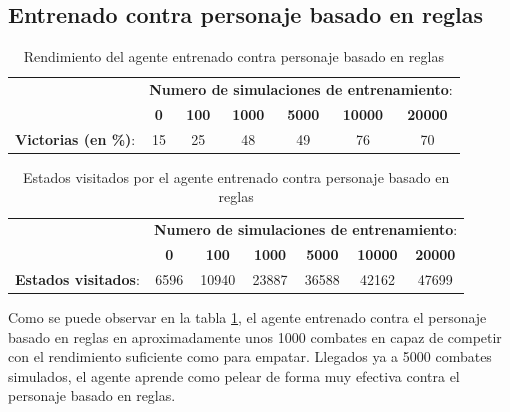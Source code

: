 \subsection{Entrenado contra personaje basado en reglas}
\label{agente1}
\begin{table}
	\begin{center}
		\begin{tabular}{c|c|c|c|c|c|c|}
			& \multicolumn{6}{c|}{\textbf{Numero de simulaciones de entrenamiento}:}\\
			\cline{2-7} & \textbf{0} & \textbf{100} & \textbf{1000} & \textbf{5000} & \textbf{10000} & \textbf{20000}\\
			
			\hline
			\textbf{Victorias (en \%)}: &  15 & 25 & 48 & 49 & 76 & 70\\
			
			\hline
		\end{tabular}
		\caption{Rendimiento del agente entrenado contra personaje basado en reglas}
		\label{rend:reglas:victorias}
	\end{center}
\end{table}

\begin{table}
	\begin{center}
		\begin{tabular}{c|c|c|c|c|c|c|}
			& \multicolumn{6}{c|}{\textbf{Numero de simulaciones de entrenamiento}:}\\
			\cline{2-7} & \textbf{0} & \textbf{100} & \textbf{1000} & \textbf{5000} & \textbf{10000} & \textbf{20000}\\
			
			\hline
			\textbf{Estados visitados}: &  6596 & 10940 & 23887 & 36588 & 42162 & 47699 \\
			
			\hline
		\end{tabular}
		\caption{Estados visitados por el agente entrenado contra personaje basado en reglas}
		\label{rend:reglas:estados}
	\end{center}
\end{table}

Como se puede observar en la tabla \ref{rend:reglas:victorias}, el agente entrenado contra el personaje basado en reglas en aproximadamente unos 1000 combates en capaz de competir con el rendimiento suficiente como para empatar. Llegados ya a 5000 combates simulados, el agente aprende como pelear de forma muy efectiva contra el personaje basado en reglas.

